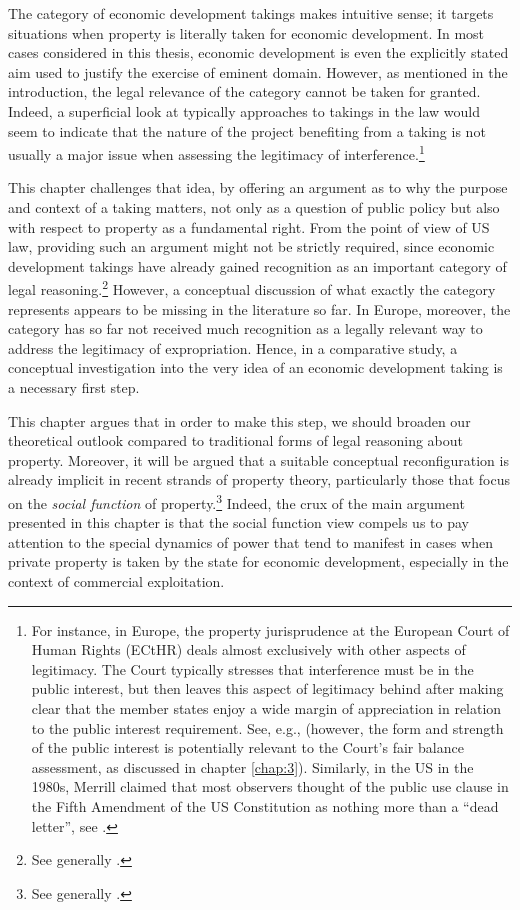 The category of economic development takings makes intuitive sense; it targets situations when property is literally taken for economic development. In most cases considered in this thesis, economic development is even the explicitly stated aim used to justify the exercise of eminent domain. However, as mentioned in the introduction, the legal relevance of the category cannot be taken for granted. Indeed, a superficial look at typically approaches to takings in the law would seem to indicate that the nature of the project benefiting from a taking is not usually a major issue when assessing the legitimacy of interference.\footnote{For instance, in Europe, the property jurisprudence at the European Court of Human Rights (ECtHR) deals almost exclusively with other aspects of legitimacy. The Court typically stresses that interference must be in the public interest, but then leaves this aspect of legitimacy behind after making clear that the member states enjoy a wide margin of appreciation in relation to the public interest requirement. See, e.g., \cite{james86,lindheim12} (however, the form and strength of the public interest is potentially relevant to the Court's fair balance assessment, as discussed in chapter \ref{chap:3}). Similarly, in the US in the 1980s, Merrill claimed that most observers thought of the public use clause in the Fifth Amendment of the US Constitution as nothing more than a ``dead letter'', see \cite[61]{merrill86}.} 

This chapter challenges that idea, by offering an argument as to why the purpose and context of a taking matters, not only as a question of public policy but also with respect to property as a fundamental right. From the point of view of US law, providing such an argument might not be strictly required, since economic development takings have already gained recognition as an important category of legal reasoning.\footnote{See generally \cite{cohen06,somin07,malloy08}.} However, a conceptual discussion of what exactly the category represents appears to be missing in the literature so far. In Europe, moreover, the category has so far not received much recognition as a legally relevant way to address the legitimacy of expropriation. Hence, in a comparative study, a conceptual investigation into the very idea of an economic development taking is a necessary first step.

This chapter argues that in order to make this step, we should broaden our theoretical outlook compared to traditional forms of legal reasoning about property. Moreover, it will be argued that a suitable conceptual reconfiguration is already implicit in recent strands of property theory, particularly those that focus on the {\it social function} of property.\footnote{See generally \cite{alexander09a,foster11,singer00,underkuffler03,alexander06,alexander10,dagan11}.} Indeed, the crux of the main argument presented in this chapter is that the social function view compels us to pay attention to the special dynamics of power that tend to manifest in cases when private property is taken by the state for economic development, especially in the context of commercial exploitation.

